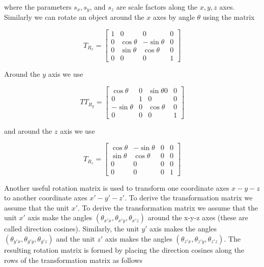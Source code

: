 where the parameters $s_x, s_y$, and $s_z$ are scale factors along the $x, y, z$ axes. Similarly we can rotate an object around the $x$ axes by angle $\theta$ using the matrix

\begin{equation}\label{eq:3.10}
T_{R_x} = \left[\begin{array}{cccc}
1 & 0 & 0 & 0 \\
0 & \cos\theta & -\sin\theta & 0 \\
0 & \sin\theta & \cos\theta & 0 \\
0 & 0 & 0 & 1
\end{array}\right]
\end{equation}


Around the $y$ axis we use

\begin{equation}\label{eq:3.11}
TT_{R_y} = \left[\begin{array}{cccc}
\cos\theta & 0 & \sin\theta0 & 0 \\
0 & 1 & 0 & 0 \\
-\sin\theta & 0 & \cos\theta & 0 \\
0 & 0 & 0 & 1
\end{array}\right]
\end{equation}

and around the $z$ axis we use

\begin{equation}\label{eq:3.12}
T_{R_z} = \left[\begin{array}{cccc}
\cos\theta & -\sin\theta & 0 & 0 \\
\sin\theta & \cos\theta & 0 & 0 \\
0 & 0 & 0 & 0 \\
0 & 0 & 0 & 1
\end{array}\right]
\end{equation}

Another useful rotation matrix is used to transform one coordinate axes $x-y-z$ to another coordinate axes $x'-y'-z'$. To derive the transformation matrix we assume that the unit $x'$. To derive the transformation matrix we assume that the unit $x'$ axis make the angles $(\theta_{x'x},\theta_{x'y},\theta_{x'z})$ around the x-y-z axes (these are called direction cosines). Similarly, the unit $y'$ axis makes the angles $(\theta_{y'x},\theta_{y'y},\theta_{y'z})$ and the unit $z'$ axis makes the angles $(\theta_{z'x},\theta_{z'y},\theta_{z'z})$. The resulting rotation matrix is formed by placing the direction cosines along the rows of the transformation matrix as follows

